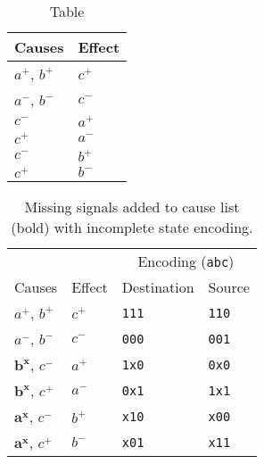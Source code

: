 \begin{table}[ht]
\caption{Table}\label{tab:causality}
\centering
\begin{tabular}{@{}ll@{}}
	\toprule
	Causes & Effect\\ \midrule
	$a^{+}$, $b^{+}$	& $c^{+}$ \\
	$a^{-}$, $b^{-}$ 	& $c^{-}$ \\
	$c^{-}$			& $a^{+}$ \\
	$c^{+}$			& $a^{-}$ \\
	$c^{-}$			& $b^{+}$ \\
	$c^{+}$			& $b^{-}$ \\
	\bottomrule
\end{tabular}
\end{table}

\begin{table}[ht]
	\caption{Missing signals added to cause list (bold) with incomplete state encoding.}\label{tab:enc}
\centering
\begin{tabular}{@{}llll@{}}
	\toprule
	& & \multicolumn{2}{c}{Encoding (\texttt{abc})}\\ \cmidrule(l){3-4}
	Causes & Effect & Destination & Source\\ \midrule
	$a^{+}$, $b^{+}$		& $c^{+}$ & \texttt{111} & \texttt{110}\\
	$a^{-}$, $b^{-}$ 		& $c^{-}$ & \texttt{000} & \texttt{001}\\
	$\mathbf{b^{x}}$, $c^{-}$	& $a^{+}$ & \texttt{1x0} & \texttt{0x0}\\
	$\mathbf{b^{x}}$, $c^{+}$	& $a^{-}$ & \texttt{0x1} & \texttt{1x1}\\
	$\mathbf{a^{x}}$, $c^{-}$	& $b^{+}$ & \texttt{x10} & \texttt{x00}\\
	$\mathbf{a^{x}}$, $c^{+}$	& $b^{-}$ & \texttt{x01} & \texttt{x11}\\
	\bottomrule
\end{tabular}
\end{table}

